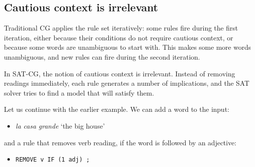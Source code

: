 

\subsection{Cautious context is irrelevant}

Traditional CG applies the rule set iteratively:
some rules fire during the first iteration, either because their
conditions do not require cautious context, or because some words are
unambiguous to start with. This makes some more words unambiguous, and
new rules can fire during the second iteration.

In SAT-CG, the notion of cautious context is irrelevant. Instead of
removing readings immediately,  each rule generates a  number of
implications, and the SAT solver tries to find a model that will satisfy them. 


Let us continue with the earlier example. 
We can add a word to the input:
\begin{itemize}
\item [] \emph{la casa grande} `the big house'
\end{itemize}
and a rule that removes verb reading, if the word is followed by an adjective:
\begin{itemize}
\item [] \texttt{REMOVE v IF (1 adj) ;}
\end{itemize}

